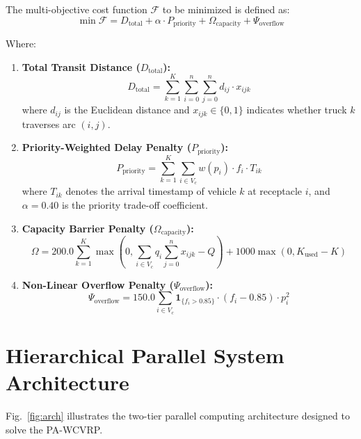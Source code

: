 \documentclass[conference]{IEEEtran}
\begin{document}
The multi-objective cost function $\mathcal{F}$ to be minimized is defined as:
\begin{equation}
\min \mathcal{F} = D_{\text{total}} + \alpha \cdot P_{\text{priority}} + \Omega_{\text{capacity}} + \Psi_{\text{overflow}}
\label{eq:cost_func}
\end{equation}

\noindent Where:
\begin{enumerate}
    \item \textbf{Total Transit Distance ($D_{\text{total}}$):}
    \begin{equation}
    D_{\text{total}} = \sum_{k=1}^K \sum_{i=0}^n \sum_{j=0}^n d_{ij} \cdot x_{ijk}
    \end{equation}
    where $d_{ij}$ is the Euclidean distance and $x_{ijk} \in \{0, 1\}$ indicates whether truck $k$ traverses arc $(i, j)$.
    
    \item \textbf{Priority-Weighted Delay Penalty ($P_{\text{priority}}$):}
    \begin{equation}
    P_{\text{priority}} = \sum_{k=1}^K \sum_{i \in V_c} w(p_i) \cdot f_i \cdot T_{ik}
    \end{equation}
    where $T_{ik}$ denotes the arrival timestamp of vehicle $k$ at receptacle $i$, and $\alpha = 0.40$ is the priority trade-off coefficient.
    
    \item \textbf{Capacity Barrier Penalty ($\Omega_{\text{capacity}}$):}
    \begin{equation}
    \Omega = 200.0 \sum_{k=1}^K \max\left(0, \sum_{i \in V_c} q_i \sum_{j=0}^n x_{ijk} - Q\right) + 1000 \max(0, K_{\text{used}} - K)
    \end{equation}
    
    \item \textbf{Non-Linear Overflow Penalty ($\Psi_{\text{overflow}}$):}
    \begin{equation}
    \Psi_{\text{overflow}} = 150.0 \sum_{i \in V_c} \mathbf{1}_{\{f_i > 0.85\}} \cdot (f_i - 0.85) \cdot p_i^2
    \end{equation}
\end{enumerate}

\section{Hierarchical Parallel System Architecture}
Fig.~\ref{fig:arch} illustrates the two-tier parallel computing architecture designed to solve the PA-WCVRP.
\end{document}
